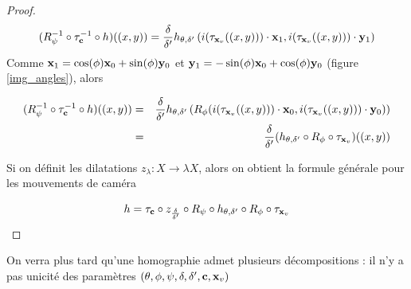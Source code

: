 \begin{proof}
\begin{equation*}
(R_{\psi}^{-1} \circ \tau_{\mathbf{c}}^{-1} \circ h)((x,y))= \frac{\delta}{\delta'}h_{\theta,\delta'}\left ( i(\tau_{\mathbf{x}_v}((x,y))) \cdot \mathbf{x}_{1}, i(\tau_{\mathbf{x}_v}((x,y))) \cdot \mathbf{y}_{1}\right)
\end{equation*}
\label{figure_de_rotations_18}
Comme $\mathbf{x}_{1}=\cos(\phi)\mathbf{x}_{0}+\sin(\phi)\mathbf{y}_{0}$ et $\mathbf{y}_{1}=-\sin(\phi)\mathbf{x}_{0}+\cos(\phi)\mathbf{y}_{0}$ (figure \ref{img_angles}), alors

\begin{eqnarray*}
(R_{\psi}^{-1} \circ \tau_{\mathbf{c}}^{-1} \circ h)((x,y)) &=& \frac{\delta}{\delta'}h_{\theta,\delta'}\left ( R_{\phi}(i(\tau_{\mathbf{x}_v}((x,y))) \cdot \mathbf{x}_{0}, i(\tau_{\mathbf{x}_v}((x,y))) \cdot \mathbf{y}_{0})\right)\\
                                               &=&\frac{\delta}{\delta'} (h_{\theta,\delta'}\circ R_{\phi} \circ \tau_{\mathbf{x}_v})((x,y))
\end{eqnarray*}

Si on définit les dilatations $z_{\lambda}:X\rightarrow \lambda X$, alors on obtient la formule générale pour les mouvements de caméra

\begin{equation*}
h = \tau_{\mathbf{c}} \circ z_{\frac{\delta}{\delta'}}  \circ R_{\psi} \circ h_{\theta,\delta'} \circ R_{\phi} \circ \tau_{\mathbf{x}_v}
\end{equation*}

\end{proof}
On verra plus tard qu'une homographie admet plusieurs décompositions : il n'y a pas unicité des paramètres $(\theta,\phi,\psi,\delta,\delta',\mathbf{c},\mathbf{x}_v)$
